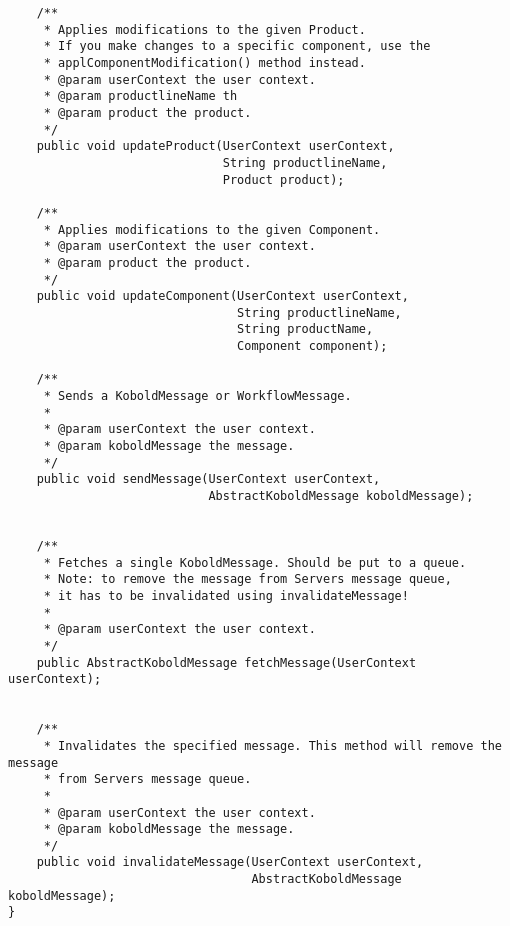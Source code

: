 \begin{verbatim}
	/**
	 * Applies modifications to the given Product.
	 * If you make changes to a specific component, use the
	 * applComponentModification() method instead.
	 * @param userContext the user context.
	 * @param productlineName th
	 * @param product the product. 
	 */
	public void updateProduct(UserContext userContext,
							  String productlineName,
							  Product product);
    
	/**
	 * Applies modifications to the given Component.
	 * @param userContext the user context.
	 * @param product the product. 
	 */
	public void updateComponent(UserContext userContext,
	        					String productlineName,
								String productName,
								Component component);
	
	/**
	 * Sends a KoboldMessage or WorkflowMessage.
	 * 
	 * @param userContext the user context.
	 * @param koboldMessage the message.
	 */
	public void sendMessage(UserContext userContext,
							AbstractKoboldMessage koboldMessage);
	
	
	/**
	 * Fetches a single KoboldMessage. Should be put to a queue.
	 * Note: to remove the message from Servers message queue,
	 * it has to be invalidated using invalidateMessage!
	 * 
	 * @param userContext the user context.
	 */
	public AbstractKoboldMessage fetchMessage(UserContext userContext);
	

	/**
	 * Invalidates the specified message. This method will remove the message
	 * from Servers message queue.
	 * 
	 * @param userContext the user context.
	 * @param koboldMessage the message.
	 */
	public void invalidateMessage(UserContext userContext,
								  AbstractKoboldMessage koboldMessage);
}
\end{verbatim}
